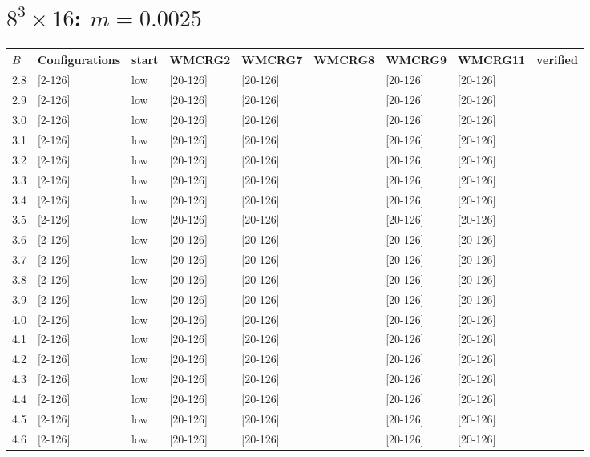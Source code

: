 \documentclass{article}
\begin{document}
  \section*{$8^3\times16$:  $m=0.0025$}
    \begin{tabular}{| l | l | l | l | l | l | l | l | l |}
      \hline
      $B$ & Configurations & start & WMCRG2 & WMCRG7 & WMCRG8 & WMCRG9 & WMCRG11 & verified\\
      \hline
      2.8 & [2-126] & low & [20-126] & [20-126] &  & [20-126] & [20-126] &\\
      2.9 & [2-126] & low & [20-126] & [20-126] &  & [20-126] & [20-126] &\\
      3.0 & [2-126] & low & [20-126] & [20-126] &  & [20-126] & [20-126] &\\
      3.1 & [2-126] & low & [20-126] & [20-126] &  & [20-126] & [20-126] &\\
      3.2 & [2-126] & low & [20-126] & [20-126] &  & [20-126] & [20-126] &\\
      3.3 & [2-126] & low & [20-126] & [20-126] &  & [20-126] & [20-126] &\\
      3.4 & [2-126] & low & [20-126] & [20-126] &  & [20-126] & [20-126] &\\
      3.5 & [2-126] & low & [20-126] & [20-126] &  & [20-126] & [20-126] &\\
      3.6 & [2-126] & low & [20-126] & [20-126] &  & [20-126] & [20-126] &\\
      3.7 & [2-126] & low & [20-126] & [20-126] &  & [20-126] & [20-126] &\\
      3.8 & [2-126] & low & [20-126] & [20-126] &  & [20-126] & [20-126] &\\
      3.9 & [2-126] & low & [20-126] & [20-126] &  & [20-126] & [20-126] &\\
      4.0 & [2-126] & low & [20-126] & [20-126] &  & [20-126] & [20-126] &\\
      4.1 & [2-126] & low & [20-126] & [20-126] &  & [20-126] & [20-126] &\\
      4.2 & [2-126] & low & [20-126] & [20-126] &  & [20-126] & [20-126] &\\
      4.3 & [2-126] & low & [20-126] & [20-126] &  & [20-126] & [20-126] &\\
      4.4 & [2-126] & low & [20-126] & [20-126] &  & [20-126] & [20-126] &\\
      4.5 & [2-126] & low & [20-126] & [20-126] &  & [20-126] & [20-126] &\\
      4.6 & [2-126] & low & [20-126] & [20-126] &  & [20-126] & [20-126] &\\

\end{tabular}
\end{document}
